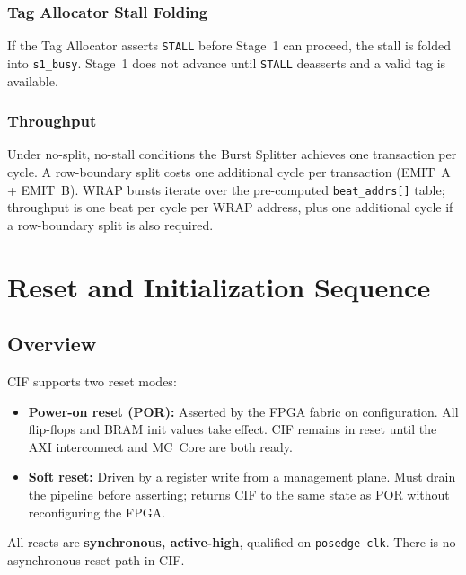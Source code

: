 \documentclass[11pt,a4paper]{article}
\begin{document}
\subsubsection*{Tag Allocator Stall Folding}

If the Tag Allocator asserts \texttt{STALL} before Stage~1 can proceed, the
stall is folded into \texttt{s1\_busy}. Stage~1 does not advance until
\texttt{STALL} deasserts and a valid tag is available.

\subsubsection*{Throughput}

Under no-split, no-stall conditions the Burst Splitter achieves one
transaction per cycle. A row-boundary split costs one additional cycle per
transaction (EMIT~A + EMIT~B). WRAP bursts iterate over the pre-computed
\texttt{beat\_addrs[]} table; throughput is one beat per cycle per WRAP
address, plus one additional cycle if a row-boundary split is also required.

\newpage
\section{Reset and Initialization Sequence}

\subsection{Overview}

CIF supports two reset modes:

\begin{itemize}
  \item \textbf{Power-on reset (POR):} Asserted by the FPGA fabric on
        configuration. All flip-flops and BRAM init values take effect. CIF
        remains in reset until the AXI interconnect and MC~Core are both ready.
  \item \textbf{Soft reset:} Driven by a register write from a management
        plane. Must drain the pipeline before asserting; returns CIF to the same
        state as POR without reconfiguring the FPGA.
\end{itemize}

All resets are \textbf{synchronous, active-high}, qualified on
\texttt{posedge clk}. There is no asynchronous reset path in CIF.
\end{document}

